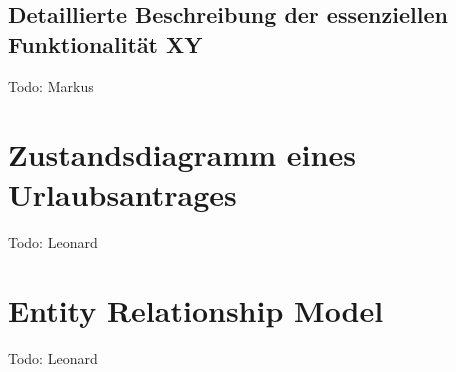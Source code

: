 \section{Detaillierte Beschreibung der essenziellen Funktionalität XY}
Todo: Markus
\chapter{Zustandsdiagramm eines Urlaubsantrages}
Todo: Leonard
\chapter{Entity Relationship Model}
Todo: Leonard

% 
% 

\clearpage
\thispagestyle{empty}


